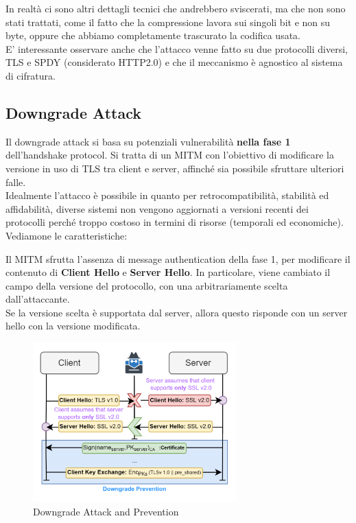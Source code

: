 \begin{remark}
In realtà  ci sono altri dettagli tecnici che andrebbero sviscerati, ma che non sono stati trattati, come il fatto che la compressione lavora sui singoli bit e non su byte, oppure che abbiamo completamente trascurato la codifica usata.\\
E' interessante osservare anche che l'attacco venne fatto su due protocolli diversi, TLS e SPDY (considerato HTTP2.0) e che il meccanismo è agnostico al sistema di cifratura.
\end{remark}
\subsection{Downgrade Attack}
Il downgrade attack si basa su potenziali vulnerabilità \textbf{nella fase 1} dell'handshake protocol. Si tratta di un MITM con l'obiettivo di modificare la versione in uso di TLS tra client e server, affinché sia possibile sfruttare ulteriori falle.\\
Idealmente l'attacco è possibile in quanto per retrocompatibilità, stabilità ed affidabilità, diverse sistemi non vengono aggiornati a versioni recenti dei protocolli perché troppo costoso in termini di risorse (temporali ed economiche). Vediamone le caratteristiche:
\begin{definition}\label{def:tlsdown}
Il MITM sfrutta l'assenza di message authentication della fase 1, per modificare il contenuto di \textbf{Client Hello} e \textbf{Server Hello}. In particolare, viene cambiato il campo della versione del protocollo, con una arbitrariamente scelta dall'attaccante.\\
Se la versione scelta è supportata dal server, allora questo risponde con un server hello con la versione modificata.
\end{definition}
\begin{figure}[h]
    \centering
    \includegraphics[width=0.7\textwidth]{image/tlsdown.png}
    \caption{Downgrade Attack and Prevention}
    \label{fig:tlsdown}
\end{figure}
